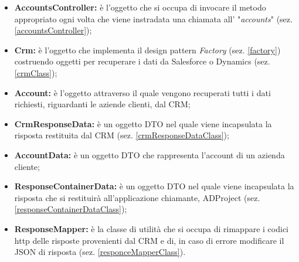 \begin{itemize}
	\item \textbf{AccountsController:} è l'oggetto che si occupa di invocare il metodo appropriato ogni volta che viene instradata una chiamata all' "\textit{accounts}" (sez. \ref{accountsController});  
	\item \textbf{Crm:} è l'oggetto che implementa il design pattern \textit{Factory} (sez. \ref{factory}) costruendo oggetti per recuperare i dati da Salesforce o Dynamics (sez. \ref{crmClass});
	\item \textbf{Account:} è l'oggetto attraverso il quale vengono recuperati tutti i dati richiesti, riguardanti le aziende clienti, dal \gls{CRM};
	\item \textbf{CrmResponseData:} è un oggetto \gls{DTO} nel quale viene incapsulata la risposta  restituita dal \gls{CRM} (sez. \ref{crmResponseDataClass});
	\item \textbf{AccountData:} è un oggetto \gls{DTO} che rappresenta l'account di un azienda cliente;
	\item \textbf{ResponseContainerData:}
	è un oggetto \gls{DTO} nel quale viene incapsulata la risposta  che si restituirà all'applicazione chiamante, ADProject (sez. \ref{responseContainerDataClass});
	\item \textbf{ResponseMapper:} è la classe di utilità che si occupa di rimappare i codici \gls{http} delle risposte provenienti dal \gls{CRM} e di, in caso di errore modificare il JSON di risposta (sez. \ref{responceMapperClass}).

\end{itemize}